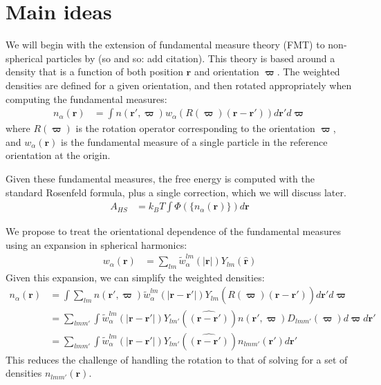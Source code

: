 \documentclass[letterpaper,twocolumn,amsmath,amssymb,pre]{revtex4-1}
\begin{document}
\section{Main ideas}

\newcommand\rr{\mathbf{r}}
\newcommand\rhat{\mathbf{\hat{r}}}
\newcommand\rot{\mathbf{\varpi}}

We will begin with the extension of fundamental measure theory (FMT)
to non-spherical particles by (so and so: add citation).  This theory
is based around a density that is a function of both position $\rr$
and orientation $\rot$.  The weighted densities are defined for a
given orientation, and then rotated appropriately when computing the
fundamental measures:
\begin{align}
  n_\alpha(\rr) &= \int n(\rr',\rot) w_\alpha(R(\rot)(\rr-\rr')) d\rr' d\rot
\end{align}
where $R(\rot)$ is the rotation operator corresponding to the
orientation $\rot$, and $w_\alpha(\rr)$ is the fundamental measure of
a single particle in the reference orientation at the origin.

Given these fundamental measures, the free energy is computed with
the standard Rosenfeld formula, plus a single correction, which we
will discuss later.
\begin{align}
  A_{HS} &= k_BT \int \Phi(\{n_\alpha(\rr)\}) d\rr
\end{align}

We propose to treat the orientational dependence of the fundamental
measures using an expansion in spherical harmonics:
\begin{align}
  w_\alpha(\rr) &= \sum_{lm} \tilde{w}_\alpha^{lm}(|\rr|) Y_{lm}(\rhat)
\end{align}
Given this expansion, we can simplify the weighted densities:
\begin{align}
  n_\alpha(\rr) &= \int \sum_{lm} n(\rr',\rot)
  \tilde{w}_\alpha^{lm}(|\rr-\rr'|)
  Y_{lm}(\widehat{R(\rot)(\rr-\rr')}) d\rr' d\rot
  \\
  &= \sum_{lmm'} \int \tilde{w}_\alpha^{lm}(|\rr-\rr'|)
  Y_{lm'}(\widehat{(\rr-\rr')})
  n(\rr',\rot)
       D_{lmm'}(\rot) d\rot d\rr'
       \\
  &=
    \sum_{lmm'} \int \tilde{w}_\alpha^{lm}(|\rr-\rr'|)
    Y_{lm'}(\widehat{(\rr-\rr')})
    n_{lmm'}(\rr') d\rr'
\end{align}
This reduces the challenge of handling the rotation to that of solving
for a set of densities $n_{lmm'}(\rr)$.
\end{document}
